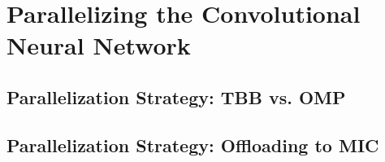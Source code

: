 
\section{Parallelizing the Convolutional Neural Network}
\label{sec-parallelizing}

\subsection{Parallelization Strategy: TBB vs. OMP}
\label{sec-parallelizing-tbbvomp}

%

\subsection{Parallelization Strategy: Offloading to MIC}
\label{sec-parallelizing-offload}

%
